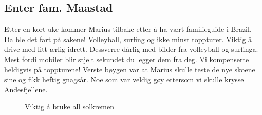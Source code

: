 \subsection*{Enter fam. Maastad}
Etter en kort uke kommer Marius tilbake etter å ha vært familieguide i
Brazil. Da ble det fart på sakene!
Volleyball, surfing og ikke minst toppturer. Viktig å drive med litt
ærlig idrett. Dessverre dårlig med bilder fra volleyball og surfinga.
Mest fordi mobiler blir stjelt sekundet du legger dem fra deg. Vi
kompenserte heldigvis på toppturene! Verste bøygen var at Marius
skulle teste de nye skoene sine og fikk heftig gnagsår. Noe som var
veldig gøy ettersom vi skulle krysse Andesfjellene. 

\begin{figure}[H]
	\centering
	
	\noindent{}
	\caption{Viktig å bruke all solkremen}
\label{fig:predradegavea}
\end{figure}

\clearpage
